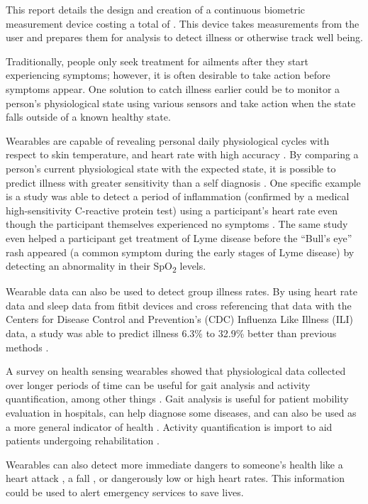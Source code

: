 This report details the design and creation of a continuous biometric measurement
device costing a total of \costofboard. This device takes measurements from the user
and prepares them for analysis to detect illness or otherwise track well being.

Traditionally, people only seek treatment for ailments after they start
experiencing symptoms; however, it is often desirable to take action before
symptoms appear.  One solution to catch illness earlier could be to monitor a
person's physiological state using various sensors and take action when the
state falls outside of a known healthy state.

Wearables are capable of revealing personal daily physiological cycles with
respect to skin temperature, and heart rate with high accuracy 
\cite{Schuurmans2020}. By comparing a person's current physiological
state with the expected state, it is possible to predict illness with greater
sensitivity than a self diagnosis \cite{POON2014543}. 
One specific example is a study was able to detect a
period of inflammation (confirmed by a medical high-sensitivity C-reactive
protein test) using a participant's heart rate even though the participant
themselves experienced no symptoms \cite{Wearable-tracking2017}.  The same
study even helped a participant get treatment of Lyme disease before the
``Bull's eye'' rash appeared (a common symptom during the early stages of Lyme
disease) by detecting an abnormality in their SpO\textsubscript{2} levels.

Wearable data can also be used to detect group illness rates.  By using heart
rate data and sleep data from fitbit devices and cross referencing that data
with the Centers for Disease Control and Prevention's (CDC) Influenza Like
Illness (ILI) data, a study was able to predict illness 6.3\% to 32.9\% better
than previous methods \cite{Radin2020}.

A survey on health sensing wearables showed that physiological data collected 
over longer periods of time can be useful for gait analysis and activity 
quantification, among other things \cite{Song2014}. Gait analysis is useful for 
patient mobility evaluation in hospitals, can help diagnose some diseases, and 
can also be used as a more general indicator of health \cite{Song2014}. Activity
quantification is import to aid patients undergoing rehabilitation \cite{Song2014}.

Wearables can also detect more immediate dangers to someone's health like a
heart attack \cite{heart-attack}, a fall \cite{Khojasteh_2018}, or dangerously
low or high heart rates.  This information could be used to alert emergency
services to save lives.

